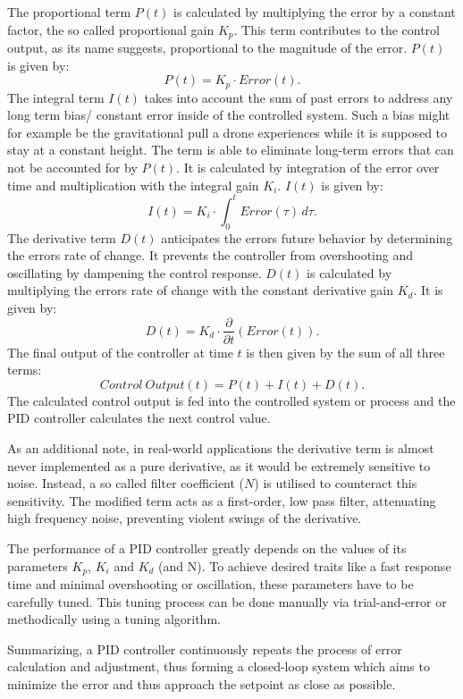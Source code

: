 The proportional term $P(t)$ is calculated by multiplying the error by a constant factor, the so called proportional gain $K_p$.
This term contributes to the control output, as its name suggests, proportional to the magnitude of the error.
$P(t)$ is given by:
\[
	P(t) = K_p \cdot Error(t)
.\]
The integral term $I(t)$ takes into account the sum of past errors to address any long term bias/ constant error inside of the controlled system.
Such a bias might for example be the gravitational pull a drone experiences while it is supposed to stay at a constant height.
The term is able to eliminate long-term errors that can not be accounted for by $P(t)$.
It is calculated by integration of the error over time and multiplication with the integral gain $K_i$.
$I(t)$ is given by:
\[
	I(t) = K_i \cdot \int_{0}^{t} Error(\tau) \,d\tau
.\]
The derivative term $D(t)$ anticipates the errors future behavior by determining the errors rate of change.
It prevents the controller from overshooting and oscillating by dampening the control response.
$D(t)$ is calculated by multiplying the errors rate of change with the constant derivative gain $K_d$.
It is given by:
\[
	D(t) = K_d \cdot \frac{\partial}{\partial t}(Error(t))
.\]
The final output of the controller at time $t$ is then given by the sum of all three terms:
\[
	Control\ Output(t) = P(t) + I(t) + D(t)
.\]
The calculated control output is fed into the controlled system or process and the PID controller calculates the next control value.

As an additional note, in real-world applications the derivative term is almost never implemented as a pure derivative, as it would be extremely sensitive to noise.
Instead, a so called filter coefficient ($N$) is utilised to counteract this sensitivity.
The modified term acts as a first-order, low pass filter, attenuating high frequency noise, preventing violent swings of the derivative.

The performance of a PID controller greatly depends on the values of its parameters $K_p$, $K_i$ and $K_d$ (and N).
To achieve desired traits like a fast response time and minimal overshooting or oscillation, these parameters have to be carefully tuned. 
This tuning process can be done manually via trial-and-error or methodically using a tuning algorithm.

Summarizing, a PID controller continuously repeats the process of error calculation and adjustment, thus forming a closed-loop system which aims to minimize the error and thus approach the setpoint as close as possible.



